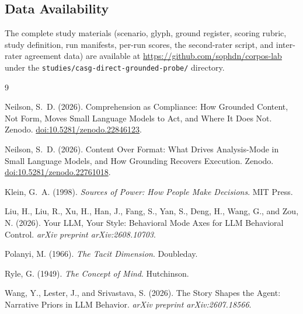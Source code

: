 \documentclass[11pt,a4paper]{article}
\begin{document}
\subsection{Data Availability}

The complete study materials (scenario, glyph, ground register, scoring
rubric, study definition, run manifests, per-run scores, the second-rater
script, and inter-rater agreement data) are available at
\url{https://github.com/sophdn/corpos-lab} under the
\texttt{studies/casg-direct-grounded-probe/} directory.



\begin{thebibliography}{9}

Neilson, S.~D. (2026).
\newblock Comprehension as Compliance: How Grounded Content, Not Form, Moves
  Small Language Models to Act, and Where It Does Not.
\newblock Zenodo. \href{https://doi.org/10.5281/zenodo.22846123}{doi:10.5281/zenodo.22846123}.

Neilson, S.~D. (2026).
\newblock Content Over Format: What Drives Analysis-Mode in Small Language
  Models, and How Grounding Recovers Execution.
\newblock Zenodo. \href{https://doi.org/10.5281/zenodo.22761018}{doi:10.5281/zenodo.22761018}.

Klein, G.~A. (1998).
\newblock \emph{Sources of Power: How People Make Decisions}.
\newblock MIT Press.

Liu, H., Liu, R., Xu, H., Han, J., Fang, S., Yan, S., Deng, H., Wang, G., and
  Zou, N. (2026).
\newblock Your LLM, Your Style: Behavioral Mode Axes for LLM Behavioral
  Control.
\newblock \emph{arXiv preprint arXiv:2608.10703}.

Polanyi, M. (1966).
\newblock \emph{The Tacit Dimension}.
\newblock Doubleday.

Ryle, G. (1949).
\newblock \emph{The Concept of Mind}.
\newblock Hutchinson.

Wang, Y., Lester, J., and Srivastava, S. (2026).
\newblock The Story Shapes the Agent: Narrative Priors in LLM Behavior.
\newblock \emph{arXiv preprint arXiv:2607.18566}.

\end{thebibliography}

\appendix
\end{document}
